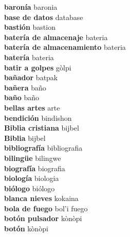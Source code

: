 \textbf{ baronía  } baronia \\
\textbf{ base de datos  } database \\
\textbf{ bastión  } bastion \\
\textbf{ batería de almacenaje  } bateria \\
\textbf{ batería de almacenamiento  } bateria \\
\textbf{ batería  } bateria \\
\textbf{ batir a golpes  } gòlpi \\
\textbf{ bañador  } batpak \\
\textbf{ bañera  } baño \\
\textbf{ baño  } baño \\
\textbf{ bellas artes  } arte \\
\textbf{ bendición  } bindishon \\
\textbf{ Biblia cristiana  } bijbel \\
\textbf{ Biblia  } bijbel \\
\textbf{ bibliografía  } bibliografia \\
\textbf{ bilingüe  } bilingwe \\
\textbf{ biografía  } biografia \\
\textbf{ biología  } biologia \\
\textbf{ biólogo  } biólogo \\
\textbf{ blanca nieves  } kokaina \\
\textbf{ bola de fuego  } bol’i fuego \\
\textbf{ botón pulsador  } kònòpi \\
\textbf{ botón  } kònòpi \\
